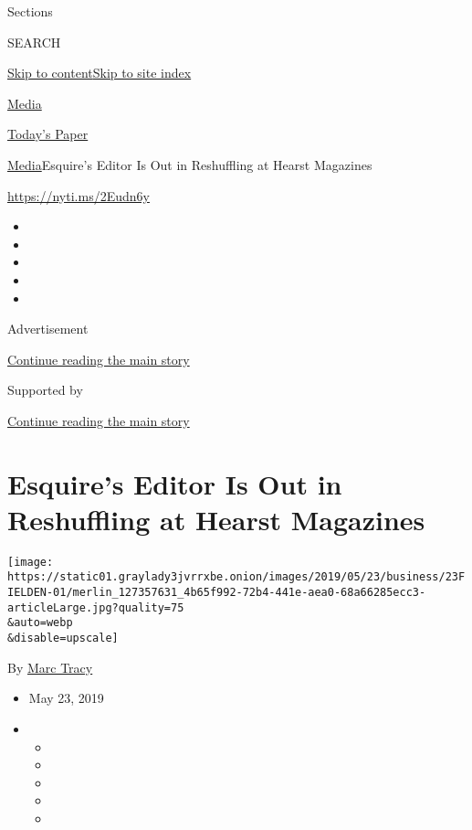 Sections

SEARCH

\protect\hyperlink{site-content}{Skip to
content}\protect\hyperlink{site-index}{Skip to site index}

\href{https://www.nytimes3xbfgragh.onion/section/business/media}{Media}

\href{https://myaccount.nytimes3xbfgragh.onion/auth/login?response_type=cookie\&client_id=vi}{}

\href{https://www.nytimes3xbfgragh.onion/section/todayspaper}{Today's
Paper}

\href{/section/business/media}{Media}\textbar{}Esquire's Editor Is Out
in Reshuffling at Hearst Magazines

\url{https://nyti.ms/2Eudn6y}

\begin{itemize}
\item
\item
\item
\item
\item
\end{itemize}

Advertisement

\protect\hyperlink{after-top}{Continue reading the main story}

Supported by

\protect\hyperlink{after-sponsor}{Continue reading the main story}

\hypertarget{esquires-editor-is-out-in-reshuffling-at-hearst-magazines}{%
\section{Esquire's Editor Is Out in Reshuffling at Hearst
Magazines}\label{esquires-editor-is-out-in-reshuffling-at-hearst-magazines}}

\texttt{[image: https://static01.graylady3jvrrxbe.onion/images/2019/05/23/business/23FIELDEN-01/merlin\_127357631\_4b65f992-72b4-441e-aea0-68a66285ecc3-articleLarge.jpg?quality=75\\\&auto=webp\\\&disable=upscale]}

By \href{https://www.nytimes3xbfgragh.onion/by/marc-tracy}{Marc Tracy}

\begin{itemize}
\item
  May 23, 2019
\item
  \begin{itemize}
  \item
  \item
  \item
  \item
  \item
  \end{itemize}
\end{itemize}

